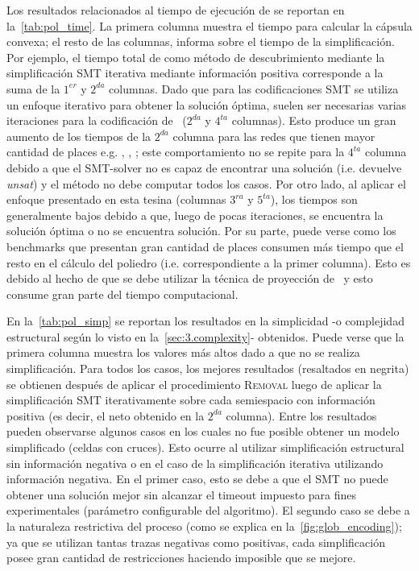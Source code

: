 Los resultados relacionados al tiempo de ejecución de \pachtool se reportan en la~\autoref{tab:pol_time}.
La primera columna muestra el tiempo para calcular la cápsula convexa; el resto de las columnas, informa
sobre el tiempo de la simplificación. Por ejemplo, el tiempo total de \pachtool como método de descubrimiento
mediante la simplificación SMT iterativa mediante información positiva corresponde a la suma de la $1^{er}$ y $2^{da}$ columnas.
Dado que para las codificaciones SMT se utiliza un enfoque iterativo para obtener la solución óptima,
suelen ser necesarias varias iteraciones para la codificación de~\cite{LeonCB15} ($2^{da}$ y $4^{ta}$ columnas). 
Esto produce un gran aumento de los tiempos de la $2^{da}$ columna para las redes que tienen mayor cantidad de places
e.g. , , ; este comportamiento no se repite para la $4^{ta}$ columna
debido a que el SMT-solver no es capaz de encontrar una solución (i.e. devuelve \emph{unsat}) y el método no debe computar todos los casos.
Por otro lado, al aplicar el enfoque presentado en esta tesina (columnas $3^{ra}$ y $5^{ta}$), los tiempos son 
generalmente bajos debido a que, luego de pocas iteraciones, se encuentra la solución óptima o no se encuentra solución.
Por su parte, puede verse como los benchmarks que presentan gran cantidad de places consumen más tiempo que el resto
en el cálculo del poliedro (i.e. correspondiente a la primer columna). Esto es debido al hecho de que se debe
utilizar la técnica de proyección de~\cite{CarmonaC14} y esto consume gran parte del tiempo computacional.




En la~\autoref{tab:pol_simp} se reportan los resultados en la simplicidad -o complejidad estructural
según lo visto en la~\autoref{sec:3.complexity}- obtenidos. 
Puede verse que la primera columna muestra los valores más altos dado a que no se realiza simplificación.
Para todos los casos, los mejores resultados (resaltados en negrita) se obtienen después de aplicar el 
procedimiento \textsc{Removal} luego de aplicar la simplificación SMT iterativamente sobre cada semiespacio
con información positiva (es decir, el neto obtenido en la $2^{da}$ columna). 
Entre los resultados pueden observarse algunos casos en los cuales no fue posible obtener
un modelo simplificado (celdas con cruces). Esto ocurre al utilizar simplificación estructural 
sin información negativa o en el caso de la simplificación iterativa utilizando información negativa.
En el primer caso, esto se debe a que el SMT no puede obtener una solución mejor sin alcanzar el timeout impuesto
para fines experimentales (parámetro configurable del algoritmo). El segundo caso se debe a la naturaleza restrictiva
del proceso (como se explica en la~\autoref{fig:glob_encoding}); ya que se utilizan tantas trazas negativas como positivas,
cada simplificación posee gran cantidad de restricciones haciendo imposible que se mejore.

